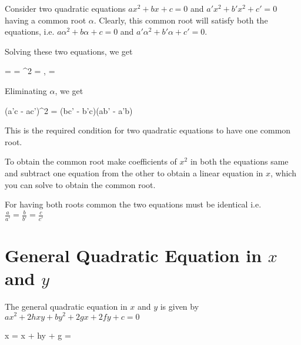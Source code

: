 \startplacefigure[title={$f(\alpha)=0,\;f'(\alpha)=0$}, reference=fig:7]
\stopplacefigure

\startplacefigure[title={$f(\alpha)=0,\;f'(\alpha)=0$}, reference=fig:8]
\stopplacefigure



Consider two quadratic equations $ax^2 + bx + c = 0$ and $a'x^2 + b'x^2 + c' = 0$ having a common root $\alpha$. Clearly, this
common root will satisfy both the equations, i.e. $a\alpha^2 + b\alpha + c = 0$ and $a'\alpha^2 + b'\alpha + c' = 0$.

Solving these two equations, we get

\startformula {} =  = \stopformula
\startformula \Rightarrow \alpha^2 = , \alpha = \stopformula

Eliminating $\alpha$, we get

\startformula (a'c - ac')^2 = (bc' - b'c)(ab' - a'b)\stopformula

This is the required condition for two quadratic equations to have one common root.

\startplacefigure[title={Common roots}, reference=fig:9]
\stopplacefigure

\startplacefigure[title={Common roots}, reference=fig:10]
\stopplacefigure

To obtain the common root make coefficients of $x^2$ in both the equations same and subtract one equation from the other to obtain
a linear equation in $x$, which you can solve to obtain the common root.

For having both roots common the two equations must be identical i.e. $\frac{a}{a'} = \frac{b}{b'} = \frac{c}{c'}$

\section{General Quadratic Equation in $x$ and $y$}
The general quadratic equation in $x$ and $y$ is given by $ax^2 + 2hxy + by^2 + 2gx + 2fy + c = 0$

\startformula \therefore x = \stopformula
\startformula \Rightarrow x + hy + g = \pm {}\stopformula

